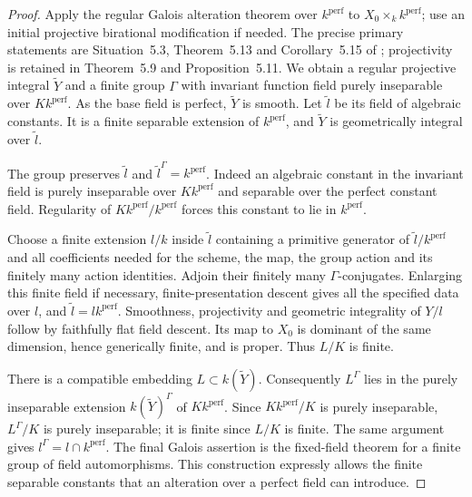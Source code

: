 \begin{proof}
Apply the regular Galois alteration theorem over $k^{\mathrm{perf}}$
to $X_0\times_k k^{\mathrm{perf}}$; use an initial projective
birational modification if needed.  The precise primary
statements are Situation~5.3, Theorem~5.13 and Corollary~5.15 of
\cite[pp.~613 and 619--620]{deJong1997}; projectivity is retained
in Theorem~5.9 and Proposition~5.11.  We obtain a regular
projective integral $\widetilde Y$ and a finite group $\Gamma$
with invariant function field purely inseparable over
$Kk^{\mathrm{perf}}$.  As the base field is perfect,
$\widetilde Y$ is smooth.  Let $\widetilde l$ be its field of
algebraic constants.  It is a finite separable extension of
$k^{\mathrm{perf}}$, and $\widetilde Y$ is geometrically
integral over $\widetilde l$.

The group preserves $\widetilde l$ and
$\widetilde l^\Gamma=k^{\mathrm{perf}}$.  Indeed an algebraic
constant in the invariant field is purely inseparable over
$Kk^{\mathrm{perf}}$ and separable over the perfect constant
field.  Regularity of $Kk^{\mathrm{perf}}/k^{\mathrm{perf}}$
forces this constant to lie in $k^{\mathrm{perf}}$.

Choose a finite extension $l/k$ inside $\widetilde l$ containing
a primitive generator of $\widetilde l/k^{\mathrm{perf}}$ and
all coefficients needed for the scheme, the map, the group
action and its finitely many action identities.  Adjoin their
finitely many $\Gamma$-conjugates.  Enlarging this finite field
if necessary, finite-presentation descent gives all the
specified data over $l$, and
$\widetilde l=lk^{\mathrm{perf}}$.  Smoothness, projectivity and
geometric integrality of $Y/l$ follow by faithfully flat field
descent.  Its map to $X_0$ is dominant of the same dimension,
hence generically finite, and is proper.  Thus $L/K$ is finite.

There is a compatible embedding $L\subset k(\widetilde Y)$.
Consequently $L^\Gamma$ lies in the purely inseparable extension
$k(\widetilde Y)^\Gamma$ of $Kk^{\mathrm{perf}}$.
Since $Kk^{\mathrm{perf}}/K$ is purely inseparable,
$L^\Gamma/K$ is purely inseparable; it is finite since $L/K$
is finite.  The same argument gives
$l^\Gamma=l\cap k^{\mathrm{perf}}$.  The final Galois assertion
is the fixed-field theorem for a finite group of field
automorphisms.  This construction expressly allows the finite
separable constants that an alteration over a perfect field
can introduce.
\end{proof}

